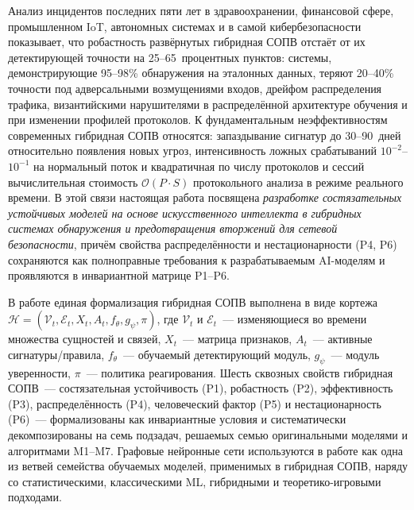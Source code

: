 \documentclass[12pt,a5paper]{article}
\begin{document}
Анализ инцидентов последних пяти лет в здравоохранении, финансовой
сфере, промышленном IoT, автономных системах и в самой
кибербезопасности показывает, что робастность развёрнутых
гибридная СОПВ отстаёт от их детектирующей точности на
25--65~процентных пунктов: системы, демонстрирующие 95--98\%
обнаружения на эталонных данных, теряют 20--40\% точности под
адверсальными возмущениями входов, дрейфом распределения трафика,
византийскими нарушителями в распределённой архитектуре обучения
и при изменении профилей протоколов. К фундаментальным
неэффективностям современных гибридная СОПВ относятся: запаздывание
сигнатур до 30--90~дней относительно появления новых угроз,
интенсивность ложных срабатываний $10^{-2}$--$10^{-1}$ на нормальный
поток и квадратичная по числу протоколов и сессий вычислительная
стоимость $\mathcal{O}(P\cdot S)$ протокольного анализа в режиме
реального времени. В этой связи настоящая работа посвящена
\emph{разработке состязательных устойчивых моделей на основе
искусственного интеллекта в гибридных системах обнаружения и
предотвращения вторжений для сетевой безопасности}, причём
свойства распределённости и нестационарности (P4, P6) сохраняются
как полноправные требования к разрабатываемым AI-моделям и
проявляются в инвариантной матрице P1--P6.

В работе единая формализация гибридная СОПВ выполнена в виде
кортежа $\mathcal{H} = (\mathcal{V}_t, \mathcal{E}_t, X_t, A_t,
f_\theta, g_\psi, \pi)$, где $\mathcal{V}_t$ и $\mathcal{E}_t$~---
изменяющиеся во времени множества сущностей и связей, $X_t$~---
матрица признаков, $A_t$~--- активные сигнатуры/правила,
$f_\theta$~--- обучаемый детектирующий модуль, $g_\psi$~---
модуль уверенности, $\pi$~--- политика реагирования. Шесть
сквозных свойств гибридная СОПВ~--- состязательная устойчивость
(P1), робастность (P2), эффективность (P3), распределённость
(P4), человеческий фактор (P5) и нестационарность (P6)~---
формализованы как инвариантные условия и систематически
декомпозированы на семь подзадач, решаемых семью оригинальными
моделями и алгоритмами M1--M7. Графовые нейронные сети
используются в работе как одна из ветвей семейства обучаемых
моделей, применимых в гибридная СОПВ, наряду со статистическими,
классическими ML, гибридными и теоретико-игровыми подходами.
\end{document}
